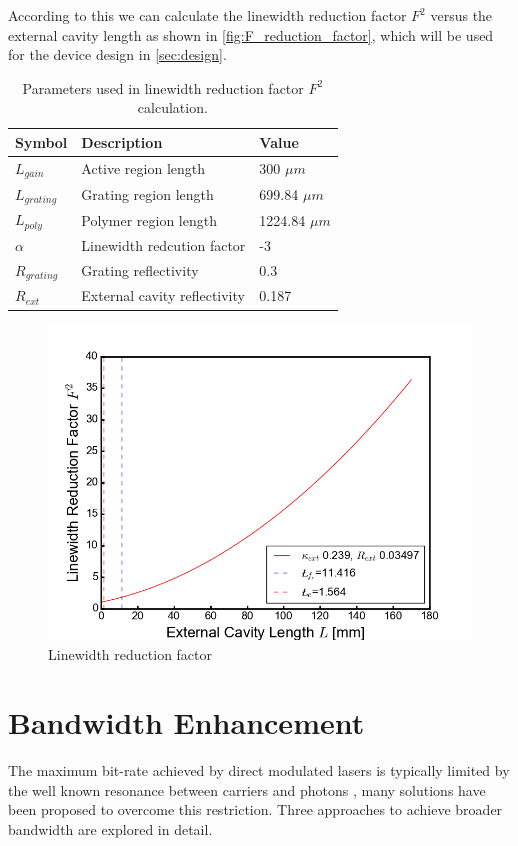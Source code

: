 According to this we can calculate the linewidth reduction factor $F^2$ versus the external cavity length as shown in \autoref{fig:F_reduction_factor}, which will be used for the device design in \autoref{sec:design}. 

\begin{table}[ht]
    \centering
    \caption{Parameters used in linewidth reduction factor $F^2$ calculation.}
    \begin{tabular}{@{}lll@{}}
    \toprule
    Symbol        & Description                  & Value           \\ \midrule
    $L_{gain}$    & Active region length         & 300 $\mu m$     \\
    $L_{grating}$ & Grating region length        & 699.84 $\mu m$  \\
    $L_{poly}$    & Polymer region length        & 1224.84 $\mu m$ \\
    $\alpha$      & Linewidth redcution factor   & -3              \\
    $R_{grating}$ & Grating reflectivity         & 0.3             \\
    $R_{ext}$     & External cavity reflectivity & 0.187           \\ \bottomrule
    \end{tabular}
    \label{tab:F_reduction_factor}
\end{table}

\begin{figure}[ht]
    \centering
    \includegraphics[width=.7\linewidth]{figures/F_reduction_factor.png}
    \caption{Linewidth reduction factor}
    \label{fig:F_reduction_factor}
\end{figure}

\section{Bandwidth Enhancement}\label{sec:bandwidth_enhancement}
The maximum bit-rate achieved by direct modulated lasers is typically limited by the well known resonance between carriers and photons \cite{coldren2012diode}, many solutions have been proposed to overcome this restriction. Three approaches to achieve broader bandwidth are explored in detail. 

